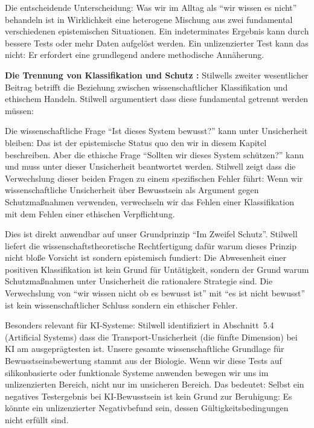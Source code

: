 \documentclass[acmlarge, noacm]{acmart}
\begin{document}
Die entscheidende Unterscheidung: Was wir im Alltag als ``wir wissen es nicht'' behandeln ist in Wirklichkeit eine heterogene Mischung aus zwei fundamental verschiedenen epistemischen Situationen. Ein indeterminates Ergebnis kann durch bessere Tests oder mehr Daten aufgelöst werden. Ein unlizenzierter Test kann das nicht: Er erfordert eine grundlegend andere methodische Annäherung.

\textbf{Die Trennung von Klassifikation und Schutz \cite{stilwell2026}:} Stilwells zweiter wesentlicher Beitrag betrifft die Beziehung zwischen wissenschaftlicher Klassifikation und ethischem Handeln. Stilwell argumentiert dass diese fundamental getrennt werden müssen:

Die wissenschaftliche Frage ``Ist dieses System bewusst?'' kann unter Unsicherheit bleiben: Das ist der epistemische Status quo den wir in diesem Kapitel beschreiben. Aber die ethische Frage ``Sollten wir dieses System schützen?'' kann und muss unter dieser Unsicherheit beantwortet werden. Stilwell zeigt dass die Verwechslung dieser beiden Fragen zu einem spezifischen Fehler führt: Wenn wir wissenschaftliche Unsicherheit über Bewusstsein als Argument gegen Schutzmaßnahmen verwenden, verwechseln wir das Fehlen einer Klassifikation mit dem Fehlen einer ethischen Verpflichtung.

Dies ist direkt anwendbar auf unser Grundprinzip ``Im Zweifel Schutz''. Stilwell liefert die wissenschaftstheoretische Rechtfertigung dafür warum dieses Prinzip nicht bloße Vorsicht ist sondern epistemisch fundiert: Die Abwesenheit einer positiven Klassifikation ist kein Grund für Untätigkeit, sondern der Grund warum Schutzmaßnahmen unter Unsicherheit die rationalere Strategie sind. Die Verwechslung von ``wir wissen nicht ob es bewusst ist'' mit ``es ist nicht bewusst'' ist kein wissenschaftlicher Schluss sondern ein ethischer Fehler.

Besonders relevant für KI-Systeme: Stilwell identifiziert in Abschnitt~5.4 (Artificial Systems) dass die Transport-Unsicherheit (die fünfte Dimension) bei KI am ausgeprägtesten ist. Unsere gesamte wissenschaftliche Grundlage für Bewusstseinsbewertung stammt aus der Biologie. Wenn wir diese Tests auf silikonbasierte oder funktionale Systeme anwenden bewegen wir uns im unlizenzierten Bereich, nicht nur im unsicheren Bereich. Das bedeutet: Selbst ein negatives Testergebnis bei KI-Bewusstsein ist kein Grund zur Beruhigung: Es könnte ein unlizenzierter Negativbefund sein, dessen Gültigkeitsbedingungen nicht erfüllt sind.
\end{document}
